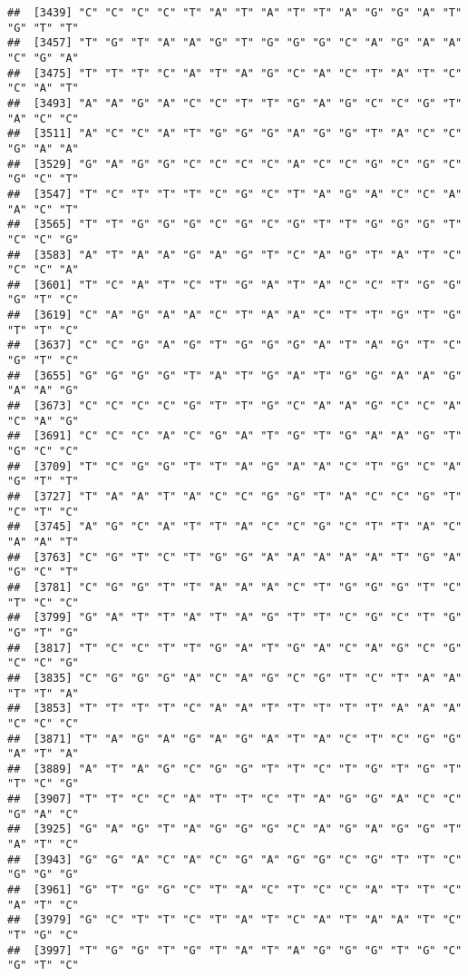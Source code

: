 \documentclass[
]{article}
\begin{document}
\begin{verbatim}
##  [3439] "C" "C" "C" "C" "T" "A" "T" "A" "T" "T" "A" "G" "G" "A" "T" "G" "T" "T"
##  [3457] "T" "G" "T" "A" "A" "G" "T" "G" "G" "G" "C" "A" "G" "A" "A" "C" "G" "A"
##  [3475] "T" "T" "T" "C" "A" "T" "A" "G" "C" "A" "C" "T" "A" "T" "C" "C" "A" "T"
##  [3493] "A" "A" "G" "A" "C" "C" "T" "T" "G" "A" "G" "C" "C" "G" "T" "A" "C" "C"
##  [3511] "A" "C" "C" "A" "T" "G" "G" "G" "A" "G" "G" "T" "A" "C" "C" "G" "A" "A"
##  [3529] "G" "A" "G" "G" "C" "C" "C" "C" "A" "C" "C" "G" "C" "G" "C" "G" "C" "T"
##  [3547] "T" "C" "T" "T" "T" "C" "G" "C" "T" "A" "G" "A" "C" "C" "A" "A" "C" "T"
##  [3565] "T" "T" "G" "G" "G" "C" "G" "C" "G" "T" "T" "G" "G" "G" "T" "C" "C" "G"
##  [3583] "A" "T" "A" "A" "G" "A" "G" "T" "C" "A" "G" "T" "A" "T" "C" "C" "C" "A"
##  [3601] "T" "C" "A" "T" "C" "T" "G" "A" "T" "A" "C" "C" "T" "G" "G" "G" "T" "C"
##  [3619] "C" "A" "G" "A" "A" "C" "T" "A" "A" "C" "T" "T" "G" "T" "G" "T" "T" "C"
##  [3637] "C" "C" "G" "A" "G" "T" "G" "G" "G" "A" "T" "A" "G" "T" "C" "G" "T" "C"
##  [3655] "G" "G" "G" "G" "T" "A" "T" "G" "A" "T" "G" "G" "A" "A" "G" "A" "A" "G"
##  [3673] "C" "C" "C" "C" "G" "T" "T" "G" "C" "A" "A" "G" "C" "C" "A" "C" "A" "G"
##  [3691] "C" "C" "C" "A" "C" "G" "A" "T" "G" "T" "G" "A" "A" "G" "T" "G" "C" "C"
##  [3709] "T" "C" "G" "G" "T" "T" "A" "G" "A" "A" "C" "T" "G" "C" "A" "G" "T" "T"
##  [3727] "T" "A" "A" "T" "A" "C" "C" "G" "G" "T" "A" "C" "C" "G" "T" "C" "T" "C"
##  [3745] "A" "G" "C" "A" "T" "T" "A" "C" "C" "G" "C" "T" "T" "A" "C" "A" "A" "T"
##  [3763] "C" "G" "T" "C" "T" "G" "G" "A" "A" "A" "A" "A" "T" "G" "A" "G" "C" "T"
##  [3781] "C" "G" "G" "T" "T" "A" "A" "A" "C" "T" "G" "G" "G" "T" "C" "T" "C" "C"
##  [3799] "G" "A" "T" "T" "A" "T" "A" "G" "T" "T" "C" "G" "C" "T" "G" "G" "T" "G"
##  [3817] "T" "C" "C" "T" "T" "G" "A" "T" "G" "A" "C" "A" "G" "C" "G" "C" "C" "G"
##  [3835] "C" "G" "G" "G" "A" "C" "A" "G" "C" "G" "T" "C" "T" "A" "A" "T" "T" "A"
##  [3853] "T" "T" "T" "T" "C" "A" "A" "T" "T" "T" "T" "T" "A" "A" "A" "C" "C" "C"
##  [3871] "T" "A" "G" "A" "G" "A" "G" "A" "T" "A" "C" "T" "C" "G" "G" "A" "T" "A"
##  [3889] "A" "T" "A" "G" "C" "G" "G" "T" "T" "C" "T" "G" "T" "G" "T" "T" "C" "G"
##  [3907] "T" "T" "C" "C" "A" "T" "T" "C" "T" "A" "G" "G" "A" "C" "C" "G" "A" "C"
##  [3925] "G" "A" "G" "T" "A" "G" "G" "G" "C" "A" "G" "A" "G" "G" "T" "A" "T" "C"
##  [3943] "G" "G" "A" "C" "A" "C" "G" "A" "G" "G" "C" "G" "T" "T" "C" "G" "G" "G"
##  [3961] "G" "T" "G" "G" "C" "T" "A" "C" "T" "C" "C" "A" "T" "T" "C" "A" "T" "C"
##  [3979] "G" "C" "T" "T" "C" "T" "A" "T" "C" "A" "T" "A" "A" "T" "C" "T" "G" "C"
##  [3997] "T" "G" "G" "T" "G" "T" "A" "T" "A" "G" "G" "G" "T" "G" "C" "G" "T" "C"

\end{verbatim}
\end{document}
